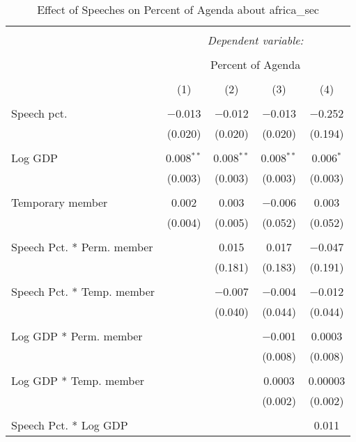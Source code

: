 
\begin{table}[!htbp] \centering 
  \caption{Effect of Speeches on Percent of Agenda about  africa_sec} 
  \label{} 
\begin{tabular}{@{\extracolsep{5pt}}lcccc} 
\\[-1.8ex]\hline 
\hline \\[-1.8ex] 
 & \multicolumn{4}{c}{\textit{Dependent variable:}} \\ 
\cline{2-5} 
\\[-1.8ex] & \multicolumn{4}{c}{Percent of Agenda} \\ 
\\[-1.8ex] & (1) & (2) & (3) & (4)\\ 
\hline \\[-1.8ex] 
 Speech pct. & $-$0.013 & $-$0.012 & $-$0.013 & $-$0.252 \\ 
  & (0.020) & (0.020) & (0.020) & (0.194) \\ 
  & & & & \\ 
 Log GDP & 0.008$^{**}$ & 0.008$^{**}$ & 0.008$^{**}$ & 0.006$^{*}$ \\ 
  & (0.003) & (0.003) & (0.003) & (0.003) \\ 
  & & & & \\ 
 Temporary member & 0.002 & 0.003 & $-$0.006 & 0.003 \\ 
  & (0.004) & (0.005) & (0.052) & (0.052) \\ 
  & & & & \\ 
 Speech Pct. * Perm. member &  & 0.015 & 0.017 & $-$0.047 \\ 
  &  & (0.181) & (0.183) & (0.191) \\ 
  & & & & \\ 
 Speech Pct. * Temp. member &  & $-$0.007 & $-$0.004 & $-$0.012 \\ 
  &  & (0.040) & (0.044) & (0.044) \\ 
  & & & & \\ 
 Log GDP * Perm. member &  &  & $-$0.001 & 0.0003 \\ 
  &  &  & (0.008) & (0.008) \\ 
  & & & & \\ 
 Log GDP * Temp. member &  &  & 0.0003 & 0.00003 \\ 
  &  &  & (0.002) & (0.002) \\ 
  & & & & \\ 
 Speech Pct. * Log GDP &  &  &  & 0.011 \\ 

\end{tabular}
\end{table}
